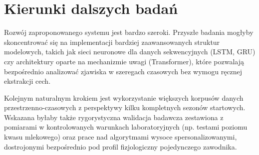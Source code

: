 \section{Kierunki dalszych badań}
Rozwój zaproponowanego systemu jest bardzo szeroki. Przyszłe badania mogłyby skoncentrować się na implementacji bardziej zaawansowanych struktur modelowych, takich jak sieci neuronowe dla danych sekwencyjnych (LSTM, GRU) czy architektury oparte na mechanizmie uwagi (Transformer), które pozwalają bezpośrednio analizować zjawiska w szeregach czasowych bez wymogu ręcznej ekstrakcji cech.

Kolejnym naturalnym krokiem jest wykorzystanie większych korpusów danych przestrzenno-czasowych z perspektywy kilku kompletnych sezonów startowych. Wskazana byłaby także rygorystyczna walidacja badawcza zestawiona z pomiarami w kontrolowanych warunkach laboratoryjnych (np. testami poziomu kwasu mlekowego) oraz prace nad algorytmami wysoce spersonalizowanymi, dostrojonymi bezpośrednio pod profil fizjologiczny pojedynczego zawodnika.
